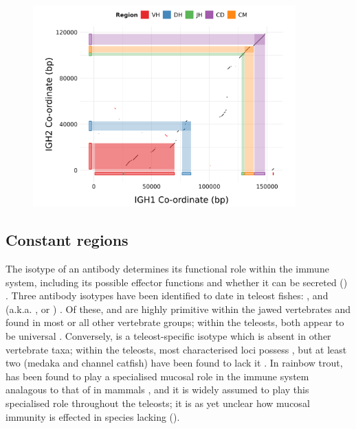\begin{figure}
	\centering
	\includegraphics[width=0.9\textwidth]{_Figures/png/nfu-locus-dots}
	\label{fig:nfu-locus-synteny}
\end{figure}
	
	\subsection{Constant regions}
	\label{sec:nfu-locus-constant}
	
	The isotype of an antibody determines its functional role within the immune system, including its possible effector functions and whether it can be secreted () \parencite{schroeder2010immunoglobulins}. Three antibody isotypes have been identified to date in teleost fishes: ,  and  (a.k.a. ,  or ) \parencite{fillatreau2013astonishing,bengten2015fishantibodies,magadan2015fishrepertoires}. Of these,  and  are highly primitive within the jawed vertebrates and found in most or all other vertebrate groups; within the teleosts, both appear to be universal \parencite{bengten2015fishantibodies}. Conversely,  is a teleost-specific isotype which is absent in other vertebrate taxa; within the teleosts, most characterised \igh{} loci possess , but at least two (medaka and channel catfish) have been found to lack it \parencite{fillatreau2013astonishing,bengten2015fishantibodies}. In rainbow trout,  has been found to play a specialised mucosal role in the immune system analagous to that of  in mammals \parencite{zhang2010igtgut,xu2013igtskin}, and it is widely assumed to play this specialised role throughout the teleosts; it is as yet unclear how mucosal immunity is effected in species lacking  ().

